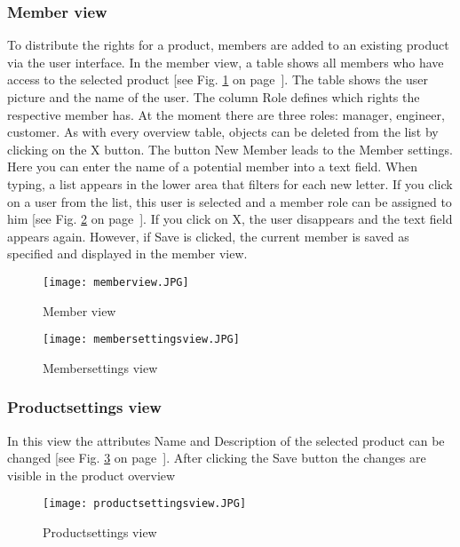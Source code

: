     \subsubsection*{Member view}
    To distribute the rights for a product, members are added to an existing product via the user interface. In the member view, a table shows all members who have access to the selected product [see Fig. \ref{fig: memberview} on page~\pageref{fig: memberview}]. The table shows the user picture and the name of the user. The column Role defines which rights the respective member has. At the moment there are three roles: manager, engineer, customer. As with every overview table, objects can be deleted from the list by clicking on the X button. The button New Member leads to the Member settings. Here you can enter the name of a potential member into a text field. When typing, a list appears in the lower area that filters for each new letter. If you click on a user from the list, this user is selected and a member role can be assigned to him [see Fig. \ref{fig: membersettingsview} on page~\pageref{fig: membersettingsview}]. If you click on X, the user disappears and the text field appears again. However, if Save is clicked, the current member is saved as specified and displayed in the member view.
    
    \begin{figure}[h]
        \centering
        \texttt{[image: memberview.JPG]}
        \caption{Member view}
        \label{fig: memberview}
    \end{figure}

    \begin{figure}[h]
        \centering
        \texttt{[image: membersettingsview.JPG]}
        \caption{Membersettings view}
        \label{fig: membersettingsview}
    \end{figure}

    \subsubsection*{Productsettings view}
    In this view the attributes Name and Description of the selected product can be changed [see Fig. \ref{fig: productsettingsview} on page~\pageref{fig: productsettingsview}]. After clicking the Save button the changes are visible in the product overview
    \begin{figure}[h]
        \centering
        \texttt{[image: productsettingsview.JPG]}
        \caption{Productsettings view}
        \label{fig: productsettingsview}
    \end{figure}